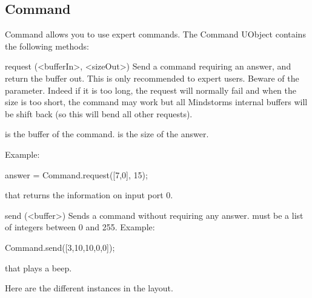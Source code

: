 \subsection{Command}

Command allows you to use expert commands. The Command UObject contains the
following methods:
\begin{urbiscriptapi}
\item[request](<bufferIn>, <sizeOut>)%
  Send a command requiring an answer, and return the buffer out. This is
  only recommended to expert users. Beware of the 
  parameter. Indeed if it is too long, the request will normally fail and
  when the size is too short, the command may work but all Mindstorms
  internal buffers will be shift back (so this will bend all other
  requests).

   is the buffer of the command.  is the size of
  the answer.

  Example:
\begin{urbiunchecked}
answer = Command.request([7,0], 15);
\end{urbiunchecked}

that returns the information on input port 0.


\item[send](<buffer>) Sends a command without requiring any answer.
   must be a list of integers between 0 and 255.  Example:
\begin{urbiunchecked}
Command.send([3,10,10,0,0]);
\end{urbiunchecked}
\noindent
that plays a beep.
\end{urbiscriptapi}

\let\subsection\subsectionOrig

\subsection{Instances}
Here are the different instances in the  layout.

